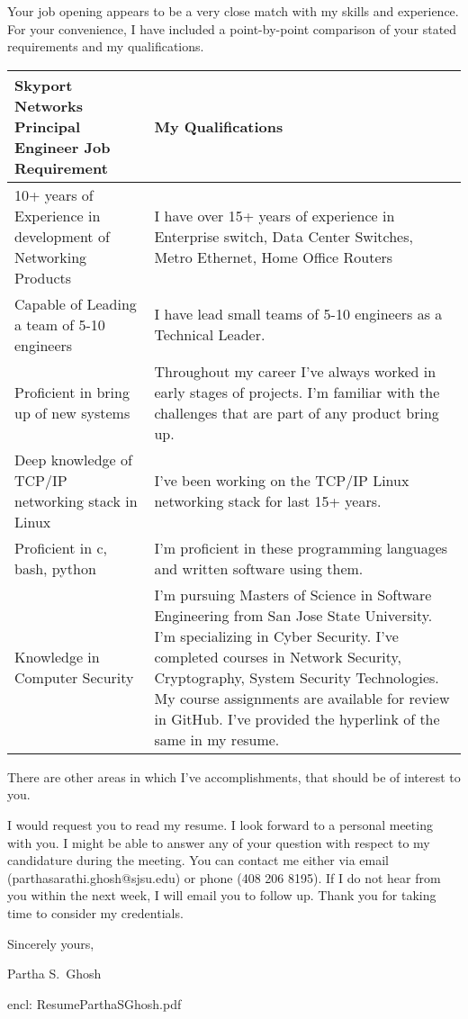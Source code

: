 \documentclass{article} %
\begin{document}
\noindent Your job opening appears to be a very close match with my skills and experience.  For your convenience, I have included a point-by-point comparison of your stated requirements and my qualifications. \\
\begin{center}
    \begin{tabular}{ |p{8cm}|p{8cm}| }
 \hline
 Skyport Networks Principal Engineer Job Requirement & My Qualifications \\
 \hline
 10+ years of Experience in development of Networking Products   &  I have over 15+ years of experience in Enterprise switch, Data Center Switches, Metro Ethernet, Home Office Routers\\
 \hline
 Capable of Leading a team of 5-10 engineers & I have lead small teams of 5-10 engineers as a Technical Leader. \\ 
 \hline
 Proficient in bring up of new systems & Throughout my career I've always worked in early stages of projects. I'm familiar with the challenges that are part of any product bring up. \\
 \hline
 Deep knowledge of TCP/IP networking stack in Linux & I've been working on the TCP/IP Linux networking stack for last 15+ years. \\
 \hline
 Proficient in c, bash, python & I'm proficient in these programming languages and written software using them. \\
 \hline
 Knowledge in Computer Security & I'm pursuing Masters of Science in Software Engineering from San Jose State University. I'm specializing in Cyber Security. I've completed courses in Network Security, Cryptography, System Security Technologies. My course assignments are available for review in GitHub. I've provided the hyperlink of the same in my resume.\\
 \hline
\end{tabular}
\end{center}

\noindent There are other areas in which I've accomplishments, that should be of interest to you. 

\noindent I would request you to read my resume. I look forward to a personal meeting with you. I might be able to answer any of your question with respect to my candidature during the meeting. You can contact me either via email (parthasarathi.ghosh@sjsu.edu) or phone (408 206 8195). If I do not hear from you within the next week, I will email you to follow up. Thank you for taking time to consider my credentials. 

\noindent Sincerely yours,

\noindent Partha S.\ Ghosh           %

\noindent encl: ResumeParthaSGhosh.pdf	%
\end{document}
